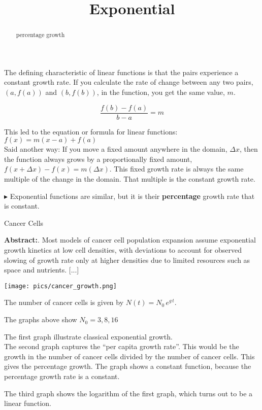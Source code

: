 \documentclass{ximera}
\title{Exponential}
\begin{document}
\begin{abstract}
percentage growth
\end{abstract}
\maketitle




The defining characteristic of linear functions is that the pairs experience a constant growth rate. If you calculate the rate of change between any two pairs, $(a, f(a))$ and $(b, f(b))$, in the function, you get the same value, $m$.


\[   \frac{f(b)-f(a)}{b-a} = m       \]

This led to the equation or formula for linear functions:  \textbf{\textcolor{purple!85!blue}{$f(x) = m(x-a) + f(a)$}}  \\


Said another way:  If you move a fixed amount anywhere in the domain, $\Delta x$, then the function always grows by a proportionally fixed amount, $f(x + \Delta x) - f(x) = m(\Delta x)$. This fixed growth rate is always the same multiple of the change in the domain. That multiple is the constant growth rate.


$\blacktriangleright$ Exponential functions are similar, but it is their \textbf{percentage} growth rate that is constant.   \\


\begin{example} Cancer Cells 


\textbf{Abstract:}. Most models of cancer cell population expansion assume exponential growth kinetics at low cell densities, with deviations to account for observed slowing of growth rate only at higher densities due to limited resources such as space and nutrients. [...] \\


\begin{image}
\texttt{[image: pics/cancer\_growth.png]}
\end{image}


The number of cancer cells is given by $N(t) = N_0 \, e^{g \, t}$.

The graphs above show $N_0 = 3, 8, 16$

The first graph illustrate classical exponential growth.  \\

The second graph captures the ``per capita growth rate''.  This would be the growth in the number of cancer cells divided by the number of cancer cells. This gives the percentage growth.  The graph shows a constant function, because the percentage growth rate is a constant.

The third graph shows the logarithm of the first graph, which turns out to be a linear function.



\end{example}
\end{document}
